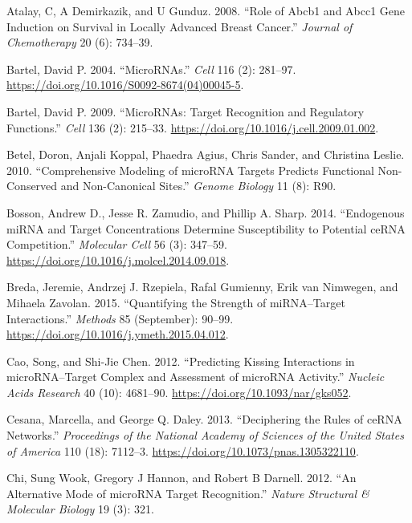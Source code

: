 \documentclass[]{article}
\begin{document}
\leavevmode\hypertarget{ref-atalay2008role}{}%
Atalay, C, A Demirkazik, and U Gunduz. 2008. ``Role of Abcb1 and Abcc1
Gene Induction on Survival in Locally Advanced Breast Cancer.''
\emph{Journal of Chemotherapy} 20 (6): 734--39.

\leavevmode\hypertarget{ref-bartel_micrornas_2004}{}%
Bartel, David P. 2004. ``MicroRNAs.'' \emph{Cell} 116 (2): 281--97.
\url{https://doi.org/10.1016/S0092-8674(04)00045-5}.

\leavevmode\hypertarget{ref-bartel_micrornas:_2009}{}%
Bartel, David P. 2009. ``MicroRNAs: Target Recognition and Regulatory
Functions.'' \emph{Cell} 136 (2): 215--33.
\url{https://doi.org/10.1016/j.cell.2009.01.002}.

\leavevmode\hypertarget{ref-betel2010comprehensive}{}%
Betel, Doron, Anjali Koppal, Phaedra Agius, Chris Sander, and Christina
Leslie. 2010. ``Comprehensive Modeling of microRNA Targets Predicts
Functional Non-Conserved and Non-Canonical Sites.'' \emph{Genome
Biology} 11 (8): R90.

\leavevmode\hypertarget{ref-bosson_endogenous_2014}{}%
Bosson, Andrew D., Jesse R. Zamudio, and Phillip A. Sharp. 2014.
``Endogenous miRNA and Target Concentrations Determine Susceptibility to
Potential ceRNA Competition.'' \emph{Molecular Cell} 56 (3): 347--59.
\url{https://doi.org/10.1016/j.molcel.2014.09.018}.

\leavevmode\hypertarget{ref-breda_quantifying_2015}{}%
Breda, Jeremie, Andrzej J. Rzepiela, Rafal Gumienny, Erik van Nimwegen,
and Mihaela Zavolan. 2015. ``Quantifying the Strength of miRNA--Target
Interactions.'' \emph{Methods} 85 (September): 90--99.
\url{https://doi.org/10.1016/j.ymeth.2015.04.012}.

\leavevmode\hypertarget{ref-cao_predicting_2012}{}%
Cao, Song, and Shi-Jie Chen. 2012. ``Predicting Kissing Interactions in
microRNA--Target Complex and Assessment of microRNA Activity.''
\emph{Nucleic Acids Research} 40 (10): 4681--90.
\url{https://doi.org/10.1093/nar/gks052}.

\leavevmode\hypertarget{ref-cesana_deciphering_2013}{}%
Cesana, Marcella, and George Q. Daley. 2013. ``Deciphering the Rules of
ceRNA Networks.'' \emph{Proceedings of the National Academy of Sciences
of the United States of America} 110 (18): 7112--3.
\url{https://doi.org/10.1073/pnas.1305322110}.

\leavevmode\hypertarget{ref-chi2012alternative}{}%
Chi, Sung Wook, Gregory J Hannon, and Robert B Darnell. 2012. ``An
Alternative Mode of microRNA Target Recognition.'' \emph{Nature
Structural \& Molecular Biology} 19 (3): 321.
\end{document}
